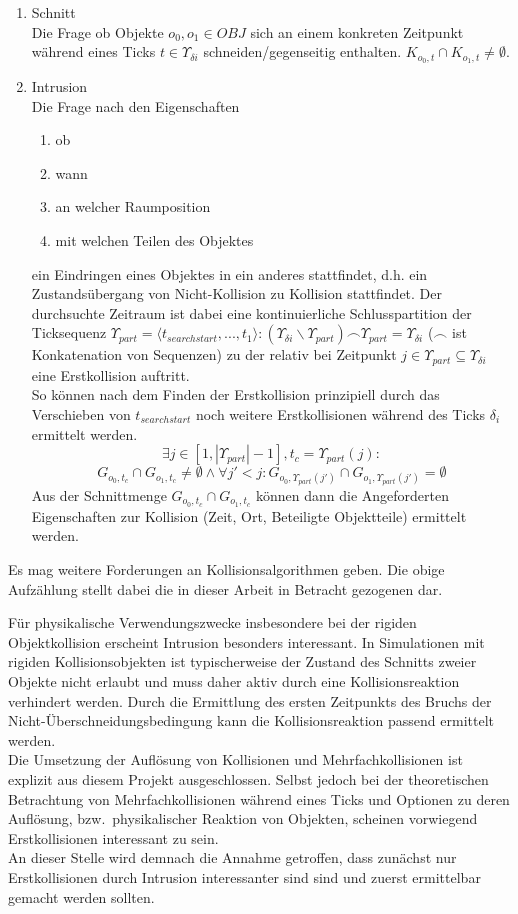 \begin{enumerate}
	\item Schnitt\\
		Die Frage ob Objekte $o_0,o_1 \in OBJ$ sich an einem konkreten Zeitpunkt während eines Ticks $t\in \Upsilon_{\delta i}$ schneiden/gegenseitig enthalten. $K_{o_0, t} \cap K_{o_1, t} \neq \emptyset$.
	\item Intrusion\\
		Die Frage nach den Eigenschaften
		\begin{enumerate}
		\item ob
		\item wann
		\item an welcher Raumposition
		\item mit welchen Teilen des Objektes
		\end{enumerate}
		ein Eindringen eines Objektes in ein anderes stattfindet, d.h. ein Zustandsübergang von Nicht-Kollision zu Kollision stattfindet.
		Der durchsuchte Zeitraum ist dabei eine kontinuierliche Schlusspartition der Ticksequenz $\Upsilon_{part} = \langle t_{searchstart}, ..., t_1 \rangle : (\Upsilon_{\delta i}\backslash \Upsilon_{part}) \smallfrown \Upsilon_{part} = \Upsilon_{\delta i} $ ($\smallfrown$ ist Konkatenation von Sequenzen) zu der relativ bei Zeitpunkt $j \in \Upsilon_{part} \subseteq \Upsilon_{\delta i}$ eine Erstkollision auftritt.\\
		So können nach dem Finden der Erstkollision prinzipiell durch das Verschieben von $t_{searchstart}$ noch weitere Erstkollisionen während des Ticks $\delta_i$ ermittelt werden.
		$$\exists j \in [1, |\Upsilon_{part}|-1], t_c= \Upsilon_{part}(j):$$
		$$ G_{o_0, t_c}\cap G_{o_1, t_c} \neq \emptyset \wedge \forall j' < j: 
		G_{o_0, \Upsilon_{part}(j')}\cap G_{o_1, \Upsilon_{part}(j')} = \emptyset$$
		Aus der Schnittmenge $G_{o_0, t_c}\cap G_{o_1, t_c}$ können dann die Angeforderten Eigenschaften zur Kollision (Zeit, Ort, Beteiligte Objektteile) ermittelt werden.
\end{enumerate}
Es mag weitere Forderungen an Kollisionsalgorithmen geben. Die obige Aufzählung stellt dabei die in dieser Arbeit in Betracht gezogenen dar.

Für physikalische Verwendungszwecke insbesondere bei der rigiden Objektkollision erscheint Intrusion besonders interessant. In Simulationen mit rigiden Kollisionsobjekten ist typischerweise der Zustand des Schnitts zweier Objekte nicht erlaubt und muss daher aktiv durch eine Kollisionsreaktion verhindert werden. Durch die Ermittlung des ersten Zeitpunkts des Bruchs der Nicht-Überschneidungsbedingung kann die Kollisionsreaktion passend ermittelt werden.\\
Die Umsetzung der Auflösung von Kollisionen und Mehrfachkollisionen ist explizit aus diesem Projekt ausgeschlossen. Selbst jedoch bei der theoretischen Betrachtung von Mehrfachkollisionen während eines Ticks und Optionen zu deren Auflösung, bzw.~physikalischer Reaktion von Objekten, scheinen vorwiegend Erstkollisionen interessant zu sein.\\
An dieser Stelle wird demnach die Annahme getroffen, dass zunächst nur Erstkollisionen durch Intrusion interessanter sind sind und zuerst ermittelbar gemacht werden sollten.



